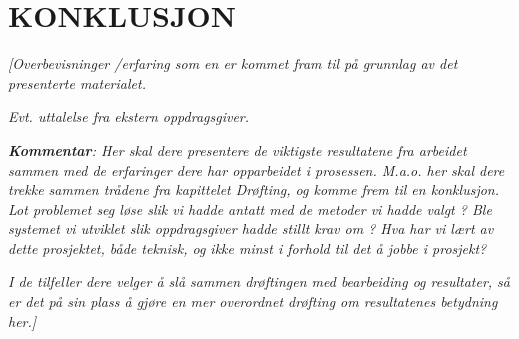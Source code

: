 \documentclass[../main.tex]{subfiles}
\begin{document}
\section{KONKLUSJON}

\bigskip

{\itshape\color{blue}
[Overbevisninger /erfaring som en er kommet fram til p{\aa} grunnlag av det presenterte materialet.}

{\itshape\color{blue}
Evt. uttalelse fra ekstern oppdragsgiver.}

{\itshape\color{blue}
\textbf{\textup{Kommentar}}: Her skal dere presentere de viktigste resultatene fra arbeidet sammen med de erfaringer
dere har opparbeidet i prosessen. M.a.o. her skal dere trekke sammen tr{\aa}dene fra kapittelet Dr{\o}fting, og komme
frem til en konklusjon. Lot problemet seg l{\o}se slik vi hadde antatt med de metoder vi hadde valgt ? Ble systemet vi
utviklet slik oppdragsgiver hadde stillt krav om ? Hva har vi l{\ae}rt av dette prosjektet, b{\aa}de teknisk, og ikke
minst i forhold til det {\aa} jobbe i prosjekt? }

{\itshape\color{blue}
I de tilfeller dere velger {\aa} sl{\aa} sammen dr{\o}ftingen med bearbeiding og resultater, s{\aa} er det p{\aa} sin
plass {\aa} gj{\o}re en mer overordnet dr{\o}fting om resultatenes betydning her.]}


\bigskip
\end{document}
